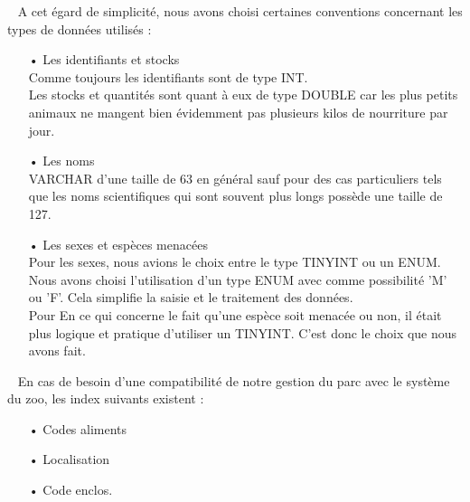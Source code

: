 \documentclass[12pt,a4paper,titlepage]{report}
\begin{document}
~ \newline
A cet égard de simplicité, nous avons choisi certaines conventions concernant les types de données utilisés :
\begin{itemize}
	\item[•] Les identifiants et stocks\\
	Comme toujours les identifiants sont de type INT. \\
	Les stocks et quantités sont quant à eux de type DOUBLE car les plus petits animaux ne mangent bien évidemment pas plusieurs kilos de nourriture par jour.
	\item[•] Les noms \\
	VARCHAR d'une taille de 63 en général sauf pour des cas particuliers tels que les noms scientifiques qui sont souvent plus longs possède une taille de 127.
	\item[•] Les sexes et espèces menacées \\
	Pour les sexes, nous avions le choix entre le type TINYINT ou un ENUM. Nous avons choisi l'utilisation d'un type ENUM avec comme possibilité 'M' ou 'F'. Cela simplifie la saisie et le traitement des données. \\
	Pour En ce qui concerne le fait qu'une espèce soit menacée ou non, il était plus logique et pratique d'utiliser un TINYINT. C'est donc le choix que nous avons fait.
\end{itemize}

~ \newline
En cas de besoin d'une compatibilité de notre gestion du parc avec le système du zoo, les index suivants existent :
\begin{itemize}
	\item[•] Codes aliments
	\item[•] Localisation
	\item[•] Code enclos.
\end{itemize}
\end{document}
